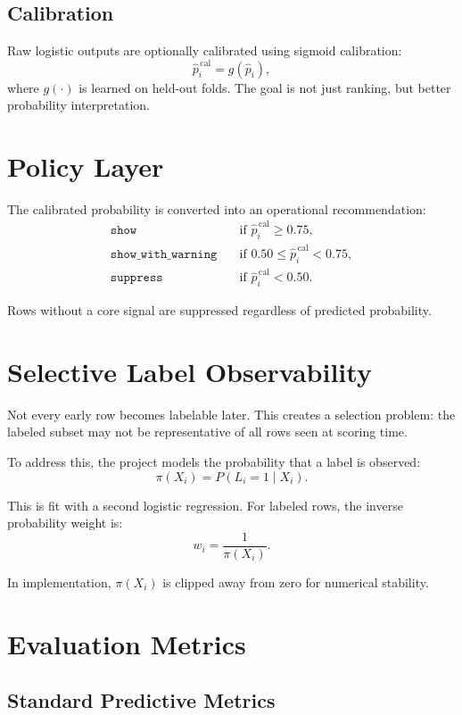 \documentclass[11pt]{article}
\begin{document}
\subsection{Calibration}

Raw logistic outputs are optionally calibrated using sigmoid calibration:
\[
\hat{p}_i^{\,\text{cal}} = g(\hat{p}_i),
\]
where $g(\cdot)$ is learned on held-out folds. The goal is not just ranking, but better probability interpretation.

\section{Policy Layer}

The calibrated probability is converted into an operational recommendation:
\begin{align*}
\texttt{show} &\quad \text{if } \hat{p}_i^{\,\text{cal}} \ge 0.75, \\
\texttt{show\_with\_warning} &\quad \text{if } 0.50 \le \hat{p}_i^{\,\text{cal}} < 0.75, \\
\texttt{suppress} &\quad \text{if } \hat{p}_i^{\,\text{cal}} < 0.50.
\end{align*}

Rows without a core signal are suppressed regardless of predicted probability.

\section{Selective Label Observability}

Not every early row becomes labelable later. This creates a selection problem: the labeled subset may not be representative of all rows seen at scoring time.

To address this, the project models the probability that a label is observed:
\[
\pi(X_i) = P(L_i = 1 \mid X_i).
\]

This is fit with a second logistic regression. For labeled rows, the inverse probability weight is:
\[
w_i = \frac{1}{\pi(X_i)}.
\]

In implementation, $\pi(X_i)$ is clipped away from zero for numerical stability.

\section{Evaluation Metrics}

\subsection{Standard Predictive Metrics}
\end{document}
